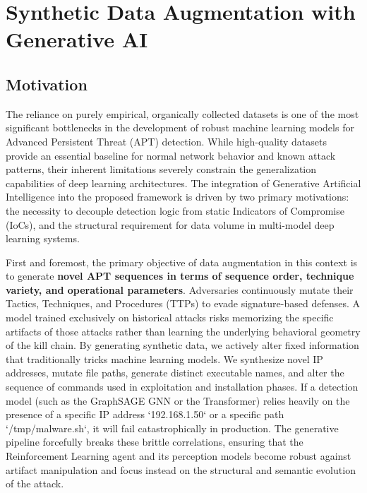 \section{Synthetic Data Augmentation with Generative AI}
\label{sec:synthetic-data}

\subsection{Motivation}
\label{subsec:synthetic_motivation}

The reliance on purely empirical, organically collected datasets is one of the most significant bottlenecks in the development of robust machine learning models for Advanced Persistent Threat (APT) detection. While high-quality datasets provide an essential baseline for normal network behavior and known attack patterns, their inherent limitations severely constrain the generalization capabilities of deep learning architectures. The integration of Generative Artificial Intelligence into the proposed framework is driven by two primary motivations: the necessity to decouple detection logic from static Indicators of Compromise (IoCs), and the structural requirement for data volume in multi-model deep learning systems.

First and foremost, the primary objective of data augmentation in this context is to generate \textbf{novel APT sequences in terms of sequence order, technique variety, and operational parameters}. Adversaries continuously mutate their Tactics, Techniques, and Procedures (TTPs) to evade signature-based defenses. A model trained exclusively on historical attacks risks memorizing the specific artifacts of those attacks rather than learning the underlying behavioral geometry of the kill chain. By generating synthetic data, we actively alter fixed information that traditionally tricks machine learning models. We synthesize novel IP addresses, mutate file paths, generate distinct executable names, and alter the sequence of commands used in exploitation and installation phases. If a detection model (such as the GraphSAGE GNN or the Transformer) relies heavily on the presence of a specific IP address `192.168.1.50` or a specific path `/tmp/malware.sh`, it will fail catastrophically in production. The generative pipeline forcefully breaks these brittle correlations, ensuring that the Reinforcement Learning agent and its perception models become robust against artifact manipulation and focus instead on the structural and semantic evolution of the attack.

